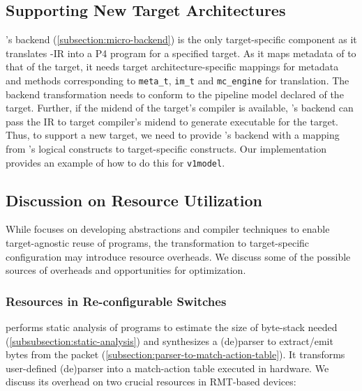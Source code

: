 \documentclass[letterpaper,twocolumn,10pt]{article}
\begin{document}





\subsection{Supporting New Target Architectures}
\label{sec:new-target}
 \ucomp's  backend
(\cref{subsection:micro-backend}) is the only target-specific
component as it translates \uarch-IR into a P4 program for a
specified target. As it maps metadata of \uarch to that of the target,
it needs target architecture-specific mappings for metadata and
methods corresponding to \texttt{meta\_t}, \texttt{im\_t} and
\texttt{mc\_engine} for translation. The backend transformation needs
to conform to the pipeline model declared of the target. Further, if
the midend of the target's compiler is available, \ucomp's backend can
pass the IR to target compiler's midend to generate executable for the
target. Thus, to support a new target, we need to provide \ucomp's
backend with a mapping from \uarch's logical constructs to
target-specific constructs. Our implementation provides an example of
how to do this for \texttt{v1model}.


\subsection{Discussion on Resource Utilization}
\label{sec:overheads}
While \ulang focuses on developing abstractions and compiler
techniques to enable target-agnostic reuse of programs, the
transformation to target-specific configuration may introduce resource
overheads. We discuss some of the possible sources of overheads and
opportunities for optimization.

\subsubsection{Resources in Re-configurable Switches}
\ucomp performs static analysis of \ulang programs to estimate the
size of byte-stack needed (\cref{subsubsection:static-analysis}) and 
synthesizes
a (de)parser to extract/emit bytes from the packet
(\cref{subsection:parser-to-match-action-table}). It transforms
user-defined (de)parser into a match-action table executed in
hardware. We discuss its overhead on two crucial resources in
RMT-based devices:
\end{document}
